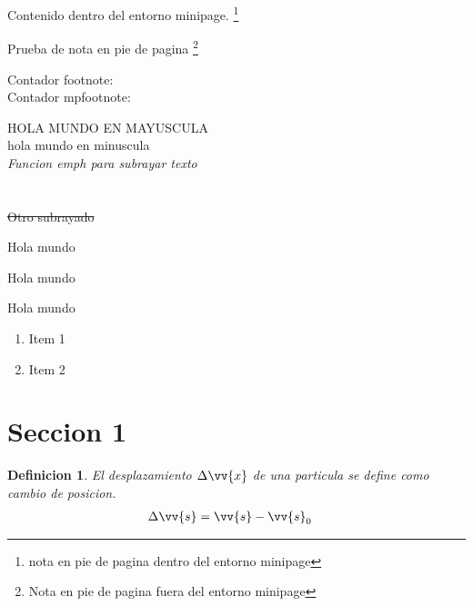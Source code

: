 \documentclass{book}
\newtheorem{definition}{Definicion}[section]
\begin{document}
 
  \begin{minipage}{\textwidth}
    Contenido dentro del entorno minipage. \footnote{nota en pie de pagina dentro del entorno minipage}
  \end{minipage}

  Prueba de nota en pie de pagina \footnote{Nota en pie de pagina fuera del entorno minipage}

  Contador footnote: \thefootnote\\
  Contador mpfootnote: \thempfootnote

  \MakeUppercase{Hola mundo en mayuscula}\\
  \MakeLowercase{Hola mundo en minuscula}\\
  \emph{Funcion emph para subrayar texto}\\
  \\
  \\
  \sout{Otro subrayado}\\

  \begin{flushright}
    Hola mundo
  \end{flushright}

  \begin{flushleft}
    Hola mundo
  \end{flushleft}

  \begin{center}
    Hola mundo
  \end{center}

  \lipsum[1]

\begin{enumerate}
  \item Item 1
  \item Item 2
\end{enumerate}

\section{Seccion 1}
\begin{definition}
  El desplazamiento $\Delta \vv{x}$ de una particula se define como cambio de posicion.
  \begin{align*}
    \Delta \vv{s} &= \vv{s} - \vv{s}_0
  \end{align*}
\end{definition}
\end{document}
